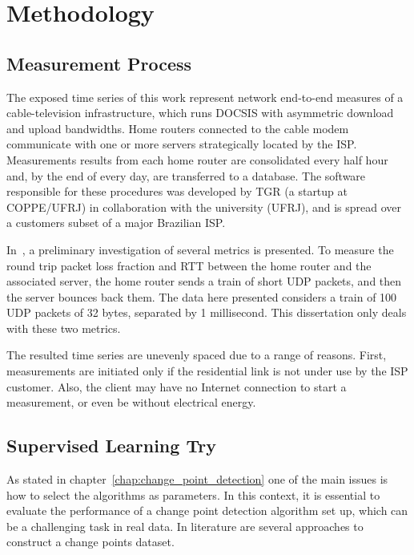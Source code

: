 \chapter{Methodology}
\label{chap:methodology}

\section{Measurement Process}

The exposed time series of this work represent network end-to-end measures of a
cable-television infrastructure, which runs DOCSIS with asymmetric download and
upload bandwidths. Home routers connected to the cable modem communicate with
one or more servers strategically located by the ISP. Measurements results from
each home router are consolidated every half hour and, by the end of every day,
are transferred to a database. The software responsible for these procedures was
developed by TGR (a startup at COPPE/UFRJ) in collaboration with the university
(UFRJ), and is spread over a customers subset of a major Brazilian ISP.

In~\cite{a_preliminary_performance_measurement_study_of_residential_broadband_services_in_brazil},
a preliminary investigation of several metrics is presented. To measure the
round
trip packet loss fraction and RTT between the home router and the associated
server, the
home router sends a train of short UDP packets, and then the server bounces back
them. The data here presented considers a train of 100 UDP packets of 32 bytes,
separated by 1 millisecond. This dissertation only deals with these two
metrics.

The resulted time series are unevenly spaced due to a range of reasons. First,
measurements are initiated only if the residential link is not under use by the
ISP customer. Also, the client may have no Internet connection to start a
measurement, or even be without electrical energy.

\section{Supervised Learning Try}

As stated in chapter~\ref{chap:change_point_detection} one of the main issues
is how to select the algorithms as parameters.
In this context, it is essential to evaluate the performance of a change point
detection algorithm set up, which can be a challenging task in real data.
In literature are several approaches to construct a
change points dataset.

